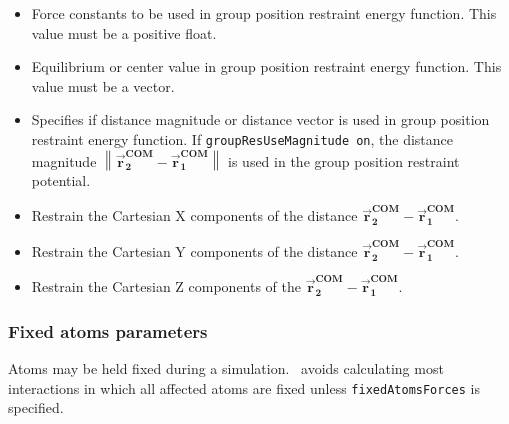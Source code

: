 \begin{itemize}
\item
{}
{Force constants to be used in group position restraint energy function.
This value must be a positive float.}

\item
{}
{Equilibrium or center value in group position restraint energy function.
This value must be a vector.}

\item
{}
{Specifies if distance magnitude or distance vector is used in group position restraint energy function. 
If {\tt groupResUseMagnitude on}, the distance magnitude
$\left \lVert \mathbf{\overrightarrow{r}^{\text{COM}}_{2}} - \mathbf{\overrightarrow{r}^{\text{COM}}_{1}} \right \rVert$ 
is used in the group position restraint potential.}

\item
{}
{Restrain the Cartesian X components of the distance 
$\mathbf{\overrightarrow{r}^{\text{COM}}_{2}} - \mathbf{\overrightarrow{r}^{\text{COM}}_{1}}$.}

\item
{}
{Restrain the Cartesian Y components of the distance 
$\mathbf{\overrightarrow{r}^{\text{COM}}_{2}} - \mathbf{\overrightarrow{r}^{\text{COM}}_{1}}$.}

\item
{}
{Restrain the Cartesian Z components of the 
$\mathbf{\overrightarrow{r}^{\text{COM}}_{2}} - \mathbf{\overrightarrow{r}^{\text{COM}}_{1}}$.}

\end{itemize}


\subsubsection{Fixed atoms parameters}

Atoms may be held fixed during a simulation.  \NAMD\ avoids calculating most interactions in which all affected atoms are fixed unless {\tt fixedAtomsForces} is specified.


